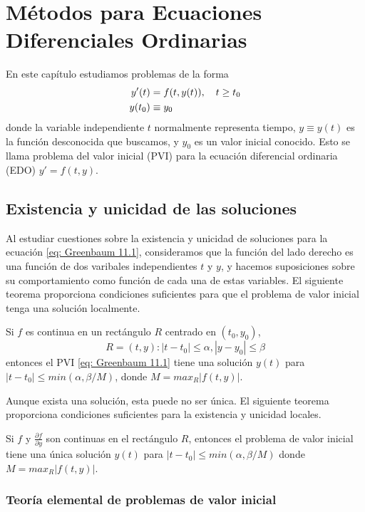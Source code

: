 \chapter{Métodos para Ecuaciones Diferenciales Ordinarias}

En este capítulo estudiamos problemas de la forma
\begin{align}
    \label{eq: Greenbaum 11.1}
    y'(t) &= f(t, y(t)), \quad t \geq t_0 \notag \\
    y(t_0) &\equiv y_0 
\end{align}
donde la variable independiente $t$ normalmente representa tiempo, $y \equiv y(t)$ es la función desconocida que buscamos, y $y_0$ es un valor inicial conocido. Esto se llama problema del valor inicial (PVI) para la ecuación diferencial ordinaria (EDO) $y' = f(t, y)$.

\section{Existencia y unicidad de las soluciones}

Al estudiar cuestiones sobre la existencia y unicidad de soluciones para la ecuación \ref{eq: Greenbaum 11.1}, consideramos que la función del lado derecho es una función de dos varibales independientes $t$ y $y$, y hacemos suposiciones sobre su comportamiento como función de cada una de estas variables. El siguiente teorema proporciona condiciones suficientes para que el problema de valor inicial tenga una solución localmente.

\begin{theorem}
    Si $f$ es continua en un rectángulo $R$ centrado en $(t_0, y_0)$, 
    \[ R = {(t, y): |t - t_0| \leq \alpha, |y - y_0| \leq \beta} \]
    entonces el PVI \ref{eq: Greenbaum 11.1} tiene una solución $y(t)$ para $|t - t_0|\leq min(\alpha, \beta/M)$, donde $M = max_R|f(t, y)|$.
\end{theorem}

Aunque exista una solución, esta puede no ser única. El siguiente teorema proporciona condiciones suficientes para la existencia y unicidad locales.

\begin{theorem}
    Si $f$ y $\frac{\partial f}{\partial y}$ son continuas en el rectángulo $R$, entonces el problema de valor inicial tiene una única solución $y(t)$ para $|t- t_0| \leq min(\alpha, \beta/M)$ donde $M = max_R|f(t, y)|$.
\end{theorem}

\subsection{Teoría elemental de problemas de valor inicial}

